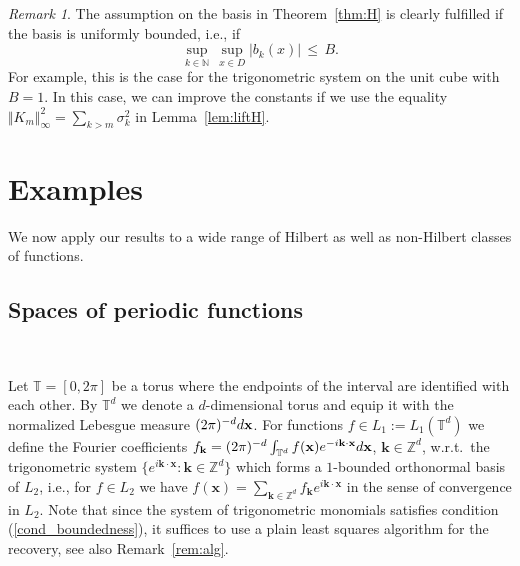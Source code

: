 \documentclass[a4paper,12pt]{amsart}
\theoremstyle{definition}
\theoremstyle{remark}
\newtheorem{remark}[theorem]{Remark}
\newcommand{\bk}{\mathbf{k}}
\newcommand{\bx}{\mathbf{x}}
\begin{document}
\begin{remark}%
The assumption on the basis in Theorem~\ref{thm:H} is clearly fulfilled 
if the basis is uniformly bounded, 
i.e., if 
\[
 \sup_{k\in \mathbb{N}}\, \sup_{x \in D} \vert b_k(x)  \vert \,\leq\, B.
\]
For example, this is the case for the trigonometric system on the unit cube with $B=1$.
In this case,
we can improve the constants
if we use the equality $\Vert K_m\Vert_\infty^2 = \sum_{k> m} \sigma_k^2$
in Lemma~\ref{lem:liftH}.
\end{remark}




\bigskip
\goodbreak

\section{Examples} %
\label{sec:ex}

We now apply our results to a wide range of Hilbert as well as non-Hilbert classes of functions. 




\subsection{Spaces of periodic functions} \, 
\label{subsec:per}

\sloppy
  Let $\mathbb{T}= [0, 2 \pi]$ be a torus where the endpoints of the interval are identified  {with each other}. By $\mathbb{T}^d$ we denote a $d$-dimensional torus and equip it with the normalized Lebesgue measure $(2\pi)^{-d} {\rm d} \bx$. For functions 
  $f\in L_1:=L_{1}(\mathbb{T}^d)$ we define
  the Fourier coefficients 
$	f_\bk= (2\pi)^{-d} \int_{\mathbb{T}^d} f(\bx) e^{-i \bk \cdot \bx} {\rm d} \bx$, $\bk\in \mathbb{Z}^d$,
 w.r.t.\ the trigonometric system
$\{ e^{i \bk \cdot \bx } \colon\allowbreak \bk \in \mathbb{Z}^d \}$
which forms a $1$-bounded orthonormal basis of $L_{2}$, 
i.e., for 
$f\in L_{2}$
we have 
$f(\bx) = \sum_{\bk\in \mathbb{Z}^d} f_\bk  e^{i \bk \cdot \bx}$ 
in the sense of convergence in $L_2$.
 {Note that since the system of trigonometric monomials satisfies condition (\ref{cond_boundedness}), it suffices to use a plain least squares algorithm for the recovery, see also Remark~\ref{rem:alg}.}
\end{document}
